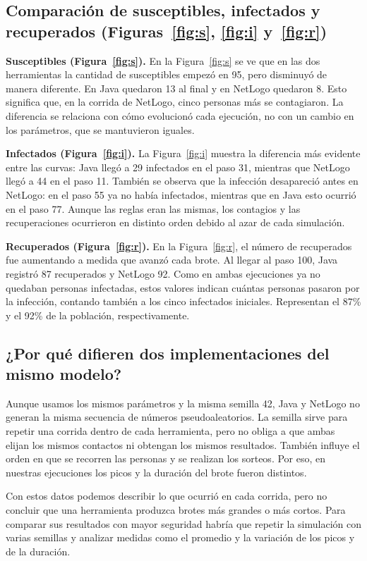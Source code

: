 \documentclass[11pt,a4paper]{article}
\begin{document}
\subsection{Comparación de susceptibles, infectados y recuperados (Figuras~\ref{fig:s}, \ref{fig:i} y~\ref{fig:r})}
\textbf{Susceptibles (Figura~\ref{fig:s}).} En la Figura~\ref{fig:s} se ve que en las dos herramientas la cantidad de susceptibles empezó en 95, pero disminuyó de manera diferente. En Java quedaron 13 al final y en NetLogo quedaron 8. Esto significa que, en la corrida de NetLogo, cinco personas más se contagiaron. La diferencia se relaciona con cómo evolucionó cada ejecución, no con un cambio en los parámetros, que se mantuvieron iguales.

\medskip
\noindent\textbf{Infectados (Figura~\ref{fig:i}).} La Figura~\ref{fig:i} muestra la diferencia más evidente entre las curvas: Java llegó a 29 infectados en el paso 31, mientras que NetLogo llegó a 44 en el paso 11. También se observa que la infección desapareció antes en NetLogo: en el paso 55 ya no había infectados, mientras que en Java esto ocurrió en el paso 77. Aunque las reglas eran las mismas, los contagios y las recuperaciones ocurrieron en distinto orden debido al azar de cada simulación.

\medskip
\noindent\textbf{Recuperados (Figura~\ref{fig:r}).} En la Figura~\ref{fig:r}, el número de recuperados fue aumentando a medida que avanzó cada brote. Al llegar al paso 100, Java registró 87 recuperados y NetLogo 92. Como en ambas ejecuciones ya no quedaban personas infectadas, estos valores indican cuántas personas pasaron por la infección, contando también a los cinco infectados iniciales. Representan el 87\% y el 92\% de la población, respectivamente.

\subsection{¿Por qué difieren dos implementaciones del mismo modelo?}
Aunque usamos los mismos parámetros y la misma semilla 42, Java y NetLogo no generan la misma secuencia de números pseudoaleatorios. La semilla sirve para repetir una corrida dentro de cada herramienta, pero no obliga a que ambas elijan los mismos contactos ni obtengan los mismos resultados. También influye el orden en que se recorren las personas y se realizan los sorteos. Por eso, en nuestras ejecuciones los picos y la duración del brote fueron distintos.

Con estos datos podemos describir lo que ocurrió en cada corrida, pero no concluir que una herramienta produzca brotes más grandes o más cortos. Para comparar sus resultados con mayor seguridad habría que repetir la simulación con varias semillas y analizar medidas como el promedio y la variación de los picos y de la duración.
\end{document}
